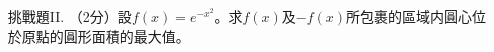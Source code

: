 \documentclass[12pt]{article}
\begin{document}
\begin{enumerate}
        \hrulefill

        \hrulefill

        \hrulefill

        \hrulefill

        \hrulefill

        \hrulefill

        \hrulefill

        \hrulefill
        \item[挑戰題II.] （2分）設$f(x)=e^{-x^2}$。求$f(x)$及$-f(x)$所包裹的區域内圓心位於原點的圓形面積的最大值。

        \hrulefill

        \hrulefill

        \hrulefill

        \hrulefill

        \hrulefill

        \hrulefill

        \hrulefill

        \hrulefill

        \hrulefill

        \hrulefill

        \hrulefill

        \hrulefill

        \hrulefill

        \hrulefill

        \hrulefill

        \hrulefill

        \hrulefill

        \hrulefill

        \hrulefill

        \hrulefill

        \hrulefill

        \hrulefill

        \hrulefill

        \hrulefill

        \hrulefill

        \hrulefill

        \hrulefill

        \hrulefill

        \hrulefill

        \hrulefill

        \hrulefill

        \hrulefill

        \hrulefill


\end{enumerate}
\end{document}
